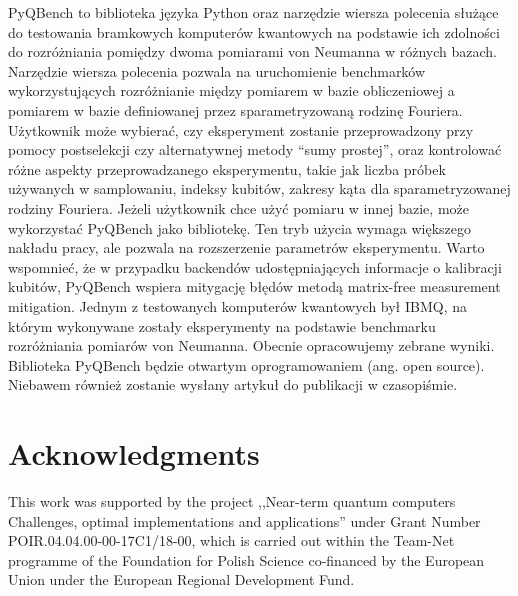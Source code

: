 \documentclass[11pt,a4paper,reqno, oneside]{amsart}
\newcommand{\1}{{\rm 1\hspace{-0.9mm}l}}
\begin{document}
PyQBench to biblioteka języka Python oraz narzędzie wiersza polecenia służące do testowania bramkowych komputerów kwantowych na podstawie ich zdolności do rozróżniania pomiędzy dwoma pomiarami von Neumanna w różnych bazach. Narzędzie wiersza polecenia pozwala na uruchomienie benchmarków wykorzystujących rozróżnianie między pomiarem w bazie obliczeniowej a pomiarem w bazie definiowanej przez sparametryzowaną rodzinę Fouriera. Użytkownik może wybierać, czy eksperyment zostanie przeprowadzony przy pomocy postselekcji czy alternatywnej metody “sumy prostej”, oraz kontrolować różne aspekty przeprowadzanego eksperymentu, takie jak liczba próbek używanych w samplowaniu, indeksy kubitów, zakresy kąta dla sparametryzowanej rodziny Fouriera. Jeżeli użytkownik chce użyć pomiaru w innej bazie, może wykorzystać PyQBench jako bibliotekę. Ten tryb użycia wymaga większego nakładu pracy, ale pozwala na rozszerzenie parametrów eksperymentu.  Warto wspomnieć, że w przypadku backendów udostępniających informacje o kalibracji kubitów, PyQBench wspiera mitygację błędów metodą matrix-free measurement mitigation. 
 Jednym z testowanych komputerów kwantowych był IBMQ, na którym wykonywane zostały eksperymenty na podstawie benchmarku rozróżniania pomiarów von Neumanna. 
Obecnie opracowujemy zebrane wyniki.
Biblioteka PyQBench będzie otwartym oprogramowaniem (ang. open source). Niebawem również zostanie wysłany artykuł do publikacji w czasopiśmie.  
\section*{Acknowledgments}


This work was supported by the project ,,Near-term quantum computers Challenges, 
optimal implementations and applications'' under
Grant Number POIR.04.04.00-00-17C1/18-00, which is carried out within the 
Team-Net programme of the
Foundation for Polish Science co-financed by the European Union under the European Regional
Development Fund.





\end{document}
